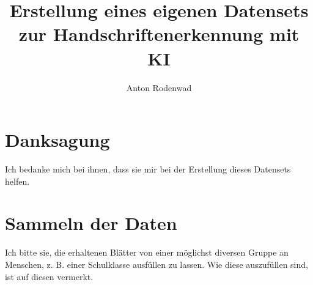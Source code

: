 \documentclass[a4paper]{article}
\begin{document}
\author{Anton Rodenwad}
\title{Erstellung eines eigenen Datensets zur Handschriftenerkennung mit KI}
\date{}

\maketitle

\thispagestyle{empty}


\section{Danksagung}
Ich bedanke mich bei ihnen, dass sie mir bei der Erstellung dieses Datensets helfen.

\section{Sammeln der Daten}
Ich bitte sie, die erhaltenen Blätter von einer möglichst diversen Gruppe an Menschen, z. B.
einer Schulklasse ausfüllen
zu lassen. Wie diese auszufüllen sind, ist auf diesen vermerkt.
\end{document}
